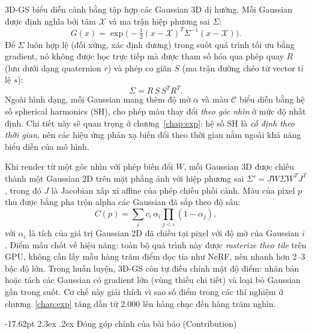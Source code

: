 \documentclass[a4paper]{report}
\makeatletter
\renewcommand\section{\@startsection{section}{1}{\z@}%
    {-17.62pt \@plus -5.89pt \@minus -1.18pt}%
    {2.3ex \@plus .2ex}%
    {\normalfont\fontsize{14.95pt}{16.31pt}\selectfont\bfseries}}
\makeatother
\begin{document}
3D-GS biểu diễn cảnh bằng tập hợp các Gaussian 3D dị hướng. Mỗi Gaussian được
định nghĩa bởi tâm $\mathcal{X}$ và ma trận hiệp phương sai $\Sigma$:
\begin{equation}
    G(x) = \exp\Big(-\tfrac{1}{2}(x-\mathcal{X})^{T}\Sigma^{-1}(x-\mathcal{X})\Big).
    \label{eq:gaussian}
\end{equation}
Để $\Sigma$ luôn hợp lệ (đối xứng, xác định dương) trong suốt quá trình tối ưu
bằng gradient, nó không được học trực tiếp mà được tham số hóa qua phép quay $R$
(lưu dưới dạng quaternion $r$) và phép co giãn $S$ (ma trận đường chéo từ vector
tỉ lệ $s$):
\begin{equation}
    \Sigma = R\,S\,S^{T}R^{T}.
    \label{eq:covariance}
\end{equation}
Ngoài hình dạng, mỗi Gaussian mang thêm độ mờ $\alpha$ và màu $\mathcal{C}$ biểu
diễn bằng hệ số spherical harmonics (SH), cho phép màu thay đổi \textit{theo góc
nhìn} ở mức độ nhất định. Chi tiết này sẽ quan trọng ở chương~\ref{chap:exp}: hệ số SH là
\textit{cố định theo thời gian}, nên các hiệu ứng phản xạ biến đổi theo thời
gian nằm ngoài khả năng biểu diễn của mô hình.

Khi render từ một góc nhìn với phép biến đổi $W$, mỗi Gaussian 3D được chiếu
thành một Gaussian 2D trên mặt phẳng ảnh với hiệp phương sai
$\Sigma' = J W \Sigma W^{T} J^{T}$, trong đó $J$ là Jacobian xấp xỉ affine của
phép chiếu phối cảnh. Màu của pixel $p$ thu được bằng pha trộn alpha các Gaussian
đã sắp theo độ sâu:
\begin{equation}
    C(p) = \sum_{i} c_i\,\alpha_i \prod_{j<i}(1-\alpha_j),
    \label{eq:alphablend}
\end{equation}
với $\alpha_i$ là tích của giá trị Gaussian 2D đã chiếu tại pixel với độ mờ của Gaussian $i$. Điểm mấu chốt về
hiệu năng: toàn bộ quá trình này được \textit{rasterize theo tile} trên GPU,
không cần lấy mẫu hàng trăm điểm dọc tia như NeRF, nên nhanh hơn 2--3 bậc độ lớn.
Trong huấn luyện, 3D-GS còn tự điều chỉnh mật độ điểm: nhân bản hoặc tách các
Gaussian có gradient lớn (vùng thiếu chi tiết) và loại bỏ Gaussian gần trong suốt.
Cơ chế này giải thích vì sao số điểm trong các thí nghiệm ở chương~\ref{chap:exp} tăng dần từ
2.000 lên hàng chục đến hàng trăm nghìn.

\section{Đóng góp chính của bài báo (Contribution)}
\end{document}

